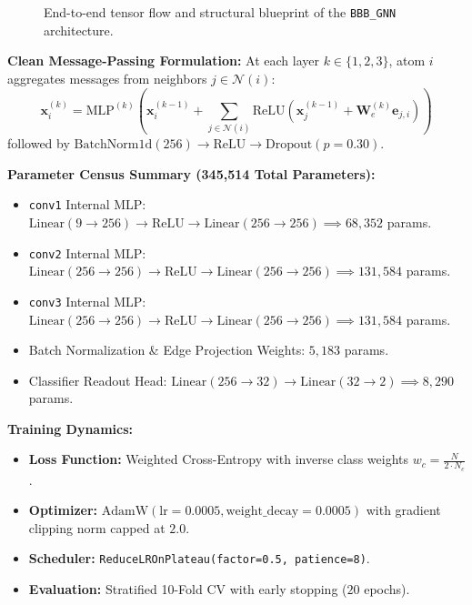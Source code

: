 \documentclass[11pt,a4paper]{article}
\begin{document}
\begin{figure}[h!]
\caption{End-to-end tensor flow and structural blueprint of the \texttt{BBB\_GNN} architecture.}
\end{figure}

\begin{mathspecbox}
\textbf{Clean Message-Passing Formulation:}
At each layer $k \in \{1, 2, 3\}$, atom $i$ aggregates messages from neighbors $j \in \mathcal{N}(i)$:
\begin{equation}
\mathbf{x}_i^{(k)} = \text{MLP}^{(k)}\left( \mathbf{x}_i^{(k-1)} + \sum_{j \in \mathcal{N}(i)} \text{ReLU}\left( \mathbf{x}_j^{(k-1)} + \mathbf{W}_e^{(k)} \mathbf{e}_{j,i} \right) \right)
\end{equation}
followed by $\text{BatchNorm1d}(256) \to \text{ReLU} \to \text{Dropout}(p=0.30)$.

\textbf{Parameter Census Summary (345,514 Total Parameters):}
\begin{itemize}[leftmargin=*]
    \item \texttt{conv1} Internal MLP: $\text{Linear}(9 \to 256) \to \text{ReLU} \to \text{Linear}(256 \to 256) \implies 68,352$ params.
    \item \texttt{conv2} Internal MLP: $\text{Linear}(256 \to 256) \to \text{ReLU} \to \text{Linear}(256 \to 256) \implies 131,584$ params.
    \item \texttt{conv3} Internal MLP: $\text{Linear}(256 \to 256) \to \text{ReLU} \to \text{Linear}(256 \to 256) \implies 131,584$ params.
    \item Batch Normalization \& Edge Projection Weights: $5,183$ params.
    \item Classifier Readout Head: $\text{Linear}(256 \to 32) \to \text{Linear}(32 \to 2) \implies 8,290$ params.
\end{itemize}

\textbf{Training Dynamics:}
\begin{itemize}[leftmargin=*]
    \item \textbf{Loss Function:} Weighted Cross-Entropy with inverse class weights $w_c = \frac{N}{2 \cdot N_c}$.
    \item \textbf{Optimizer:} $\text{AdamW}(\text{lr} = 0.0005, \text{weight\_decay} = 0.0005)$ with gradient clipping norm capped at $2.0$.
    \item \textbf{Scheduler:} \texttt{ReduceLROnPlateau(factor=0.5, patience=8)}.
    \item \textbf{Evaluation:} Stratified 10-Fold CV with early stopping ($20$ epochs).
\end{itemize}
\end{mathspecbox}
\end{document}
